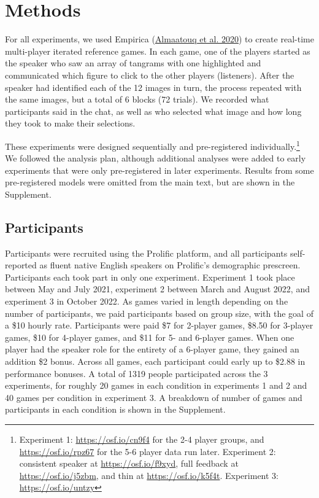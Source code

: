 \documentclass[
  english,
  a4paper,
]{article}
\begin{document}
\hypertarget{methods}{%
\section{Methods}\label{methods}}

For all experiments, we used Empirica (\protect\hyperlink{ref-almaatouq2020}{Almaatouq et al. 2020}) to create real-time multi-player iterated reference games. In each game, one of the players started as the speaker who saw an array of tangrams with one highlighted and communicated which figure to click to the other players (listeners). After the speaker had identified each of the 12 images in turn, the process repeated with the same images, but a total of 6 blocks (72 trials). We recorded what participants said in the chat, as well as who selected what image and how long they took to make their selections.

These experiments were designed sequentially and pre-registered individually.\footnote{Experiment 1: \url{https://osf.io/cn9f4} for the 2-4 player groups, and \url{https://osf.io/rpz67} for the 5-6 player data run later. Experiment 2: consistent speaker at \url{https://osf.io/f9xyd}, full feedback at \url{https://osf.io/j5zbm}, and thin at \url{https://osf.io/k5f4t}. Experiment 3: \url{https://osf.io/untzy}} We followed the analysis plan, although additional analyses were added to early experiments that were only pre-registered in later experiments. Results from some pre-registered models were omitted from the main text, but are shown in the Supplement.

\hypertarget{participants}{%
\subsection{Participants}\label{participants}}

Participants were recruited using the Prolific platform, and all participants self-reported as fluent native English speakers on Prolific's demographic prescreen. Participants each took part in only one experiment. Experiment 1 took place between May and July 2021, experiment 2 between March and August 2022, and experiment 3 in October 2022. As games varied in length depending on the number of participants, we paid participants based on group size, with the goal of a \$10 hourly rate. Participants were paid \$7 for 2-player games, \$8.50 for 3-player games, \$10 for 4-player games, and \$11 for 5- and 6-player games. When one player had the speaker role for the entirety of a 6-player game, they gained an addition \$2 bonus. Across all games, each participant could early up to \$2.88 in performance bonuses. A total of 1319 people participated across the 3 experiments, for roughly 20 games in each condition in experiments 1 and 2 and 40 games per condition in experiment 3. A breakdown of number of games and participants in each condition is shown in the Supplement.
\end{document}
